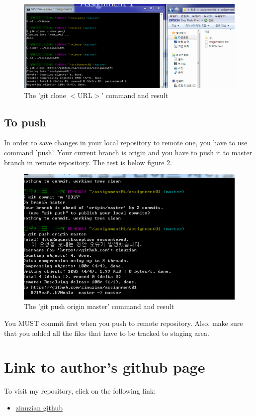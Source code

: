 \documentclass{article}
\begin{document}
    \begin{figure}[h!]
    \centering
    \includegraphics[scale=0.5]{git_clone_remote}
    \caption{The 'git clone $<$URL$>$' command and result}
    \label{fig:clone_local}
    \end{figure}
    
    \subsection {To push}
    In order to save changes in your local repository to remote one, you have to use command 'push'. Your current branch is origin and you have to push it to master branch in remote repository. The test is below figure \ref{fig:push}.
    \begin{figure}[h!]
    \centering
    \includegraphics[scale=0.5]{git_push}
    \caption{The 'git push origin master' command and result}
    \label{fig:push}
    \end{figure}
    You MUST commit first when you push to remote repository. Also, make sure that you added all the files that have to be tracked to staging area.

\section{Link to author's github page}
To visit my repository, click on the following link: 
\begin{itemize}
    \item \href{https://github.com/zinuzian/assignment01}{zinuzian github}
\end{itemize}
\end{document}
